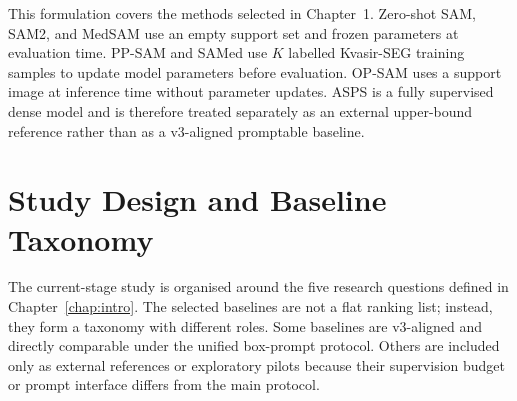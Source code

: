 This formulation covers the methods selected in Chapter~1. Zero-shot SAM, SAM2, and MedSAM use an empty support set and frozen parameters at evaluation time. PP-SAM and SAMed use $K$ labelled Kvasir-SEG training samples to update model parameters before evaluation. OP-SAM uses a support image at inference time without parameter updates. ASPS is a fully supervised dense model and is therefore treated separately as an external upper-bound reference rather than as a v3-aligned promptable baseline.

\section{Study Design and Baseline Taxonomy}
\label{sec:baseline-taxonomy}

The current-stage study is organised around the five research questions defined in Chapter~\ref{chap:intro}. The selected baselines are not a flat ranking list; instead, they form a taxonomy with different roles. Some baselines are v3-aligned and directly comparable under the unified box-prompt protocol. Others are included only as external references or exploratory pilots because their supervision budget or prompt interface differs from the main protocol.

